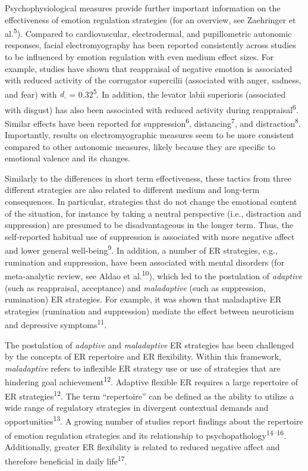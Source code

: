 \documentclass[
  man,floatsintext]{apa6}
\begin{document}
Psychophysiological measures provide further important information on the effectiveness of emotion regulation strategies (for an overview, see Zaehringer et al.\textsuperscript{5}).
Compared to cardiovascular, electrodermal, and pupillometric autonomic responses, facial electromyography has been reported consistently across studies to be influenced by emotion regulation with even medium effect sizes.
For example, studies have shown that reappraisal of negative emotion is associated with reduced activity of the corrugator supercilii (associated with anger, sadness, and fear) with \emph{d\textsubscript{-}} = 0.32\textsuperscript{5}.
In addition, the levator labii superioris (associated with disgust) has also been associated with reduced activity during reappraisal\textsuperscript{6}.
Similar effects have been reported for suppression\textsuperscript{6}, distancing\textsuperscript{7}, and distraction\textsuperscript{8}.
Importantly, results on electromyographic measures seem to be more consistent compared to other autonomic measures, likely because they are specific to emotional valence and its changes.

Similarly to the differences in short term effectiveness, these tactics from three different strategies are also related to different medium and long-term consequences.
In particular, strategies that do not change the emotional content of the situation, for instance by taking a neutral perspective (i.e., distraction and suppression) are presumed to be disadvantageous in the longer term.
Thus, the self-reported habitual use of suppression is associated with more negative affect and lower general well-being\textsuperscript{9}.
In addition, a number of ER strategies, e.g., rumination and suppression, have been associated with mental disorders (for meta-analytic review, see Aldao et al.\textsuperscript{10}), which led to the postulation of \emph{adaptive} (such as reappraisal, acceptance) and \emph{maladaptive} (such as suppression, rumination) ER strategies.
For example, it was shown that maladaptive ER strategies (rumination and suppression) mediate the effect between neuroticism and depressive symptoms\textsuperscript{11}.

The postulation of \emph{adaptive} and \emph{maladaptive} ER strategies has been challenged by the concepts of ER repertoire and ER flexibility.
Within this framework, \emph{maladaptive} refers to inflexible ER strategy use or use of strategies that are hindering goal achievement\textsuperscript{12}.
Adaptive flexible ER requires a large repertoire of ER strategies\textsuperscript{12}.
The term ``repertoire'' can be defined as the ability to utilize a wide range of regulatory strategies in divergent contextual demands and opportunities\textsuperscript{13}.
A growing number of studies report findings about the repertoire of emotion regulation strategies and its relationship to psychopathology\textsuperscript{14--16}.
Additionally, greater ER flexibility is related to reduced negative affect and therefore beneficial in daily life\textsuperscript{17}.
\end{document}
